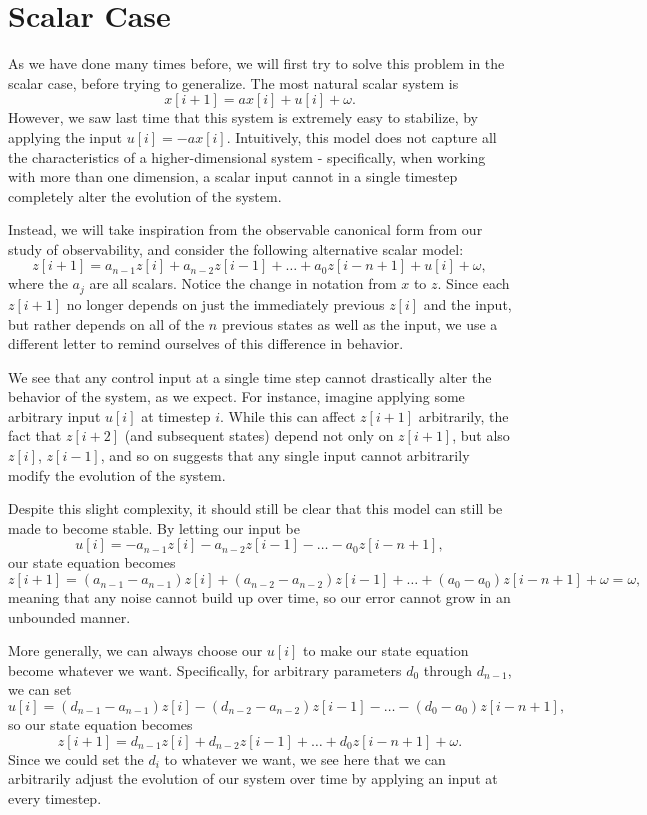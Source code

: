 \documentclass[letterpaper]{article}
\theoremstyle{remark}
\begin{document}
\section{Scalar Case}
As we have done many times before, we will first try to solve this problem in the scalar case, before trying to generalize. The most natural scalar system is
\[
    x[i + 1] = ax[i] + u[i] + \omega.
\]
However, we saw last time that this system is extremely easy to stabilize, by applying the input $u[i] = -ax[i]$. Intuitively, this model does not capture all the characteristics of a higher-dimensional system - specifically, when working with more than one dimension, a scalar input cannot in a single timestep completely alter the evolution of the system.

Instead, we will take inspiration from the observable canonical form from our study of observability, and consider the following alternative scalar model:
\[
    z[i + 1] = a_{n - 1}z[i] + a_{n - 2}z[i-1] + \ldots + a_0z[i - n + 1] + u[i] + \omega,
\]
where the $a_j$ are all scalars. Notice the change in notation from $x$ to $z$. Since each $z[i + 1]$ no longer depends on just the immediately previous $z[i]$ and the input, but rather depends on all of the $n$ previous states as well as the input, we use a different letter to remind ourselves of this difference in behavior.

We see that any control input at a single time step cannot drastically alter the behavior of the system, as we expect. For instance, imagine applying some arbitrary input $u[i]$ at timestep $i$. While this can affect $z[i + 1]$ arbitrarily, the fact that $z[i + 2]$ (and subsequent states) depend not only on $z[i + 1]$, but also $z[i]$, $z[i - 1]$, and so on suggests that any single input cannot arbitrarily modify the evolution of the system.

Despite this slight complexity, it should still be clear that this model can still be made to become stable. By letting our input be
\[
    u[i] = -a_{n-1}z[i] - a_{n-2}z[i - 1] - \ldots - a_0z[i - n + 1],
\]
our state equation becomes
\[
    z[i + 1] = (a_{n-1}-a_{n-1})z[i] + (a_{n-2}-a_{n-2})z[i-1] + \ldots + (a_0-a_0)z[i - n + 1] + \omega = \omega,
\]
meaning that any noise cannot build up over time, so our error cannot grow in an unbounded manner.

More generally, we can always choose our $u[i]$ to make our state equation become whatever we want. Specifically, for arbitrary parameters $d_0$ through $d_{n-1}$, we can set
\[
    u[i] = (d_{n-1} - a_{n-1})z[i] - (d_{n-2} - a_{n-2})z[i - 1] - \ldots - (d_0 - a_0)z[i - n + 1],
\]
so our state equation becomes
\[
    z[i+1] = d_{n-1}z[i] + d_{n-2}z[i-1] + \ldots + d_0z[i - n + 1] + \omega.
\]
Since we could set the $d_i$ to whatever we want, we see here that we can arbitrarily adjust the evolution of our system over time by applying an input at every timestep.
\end{document}
